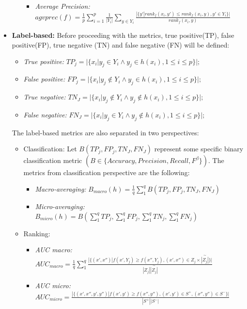 \documentclass[12pt]{report}
\begin{document}
\begin{itemize}
\begin{itemize}
\begin{itemize}
				\item \emph{Average Precision: } $agvprec(f) = \frac{1}{p} \sum_{i=1}^{p} \frac{1}{|Y_i|} \sum_{y \in Y_i} \frac{|\{y' | rank_f(x_i,y') \leq rank_f(x_i,y), y' \in Y_i\}|}{rank_f(x_i,y)}$
			\end{itemize}
		\end{itemize}
		\item \textbf{Label-based: }Before proceeding with the metrics, true positive(TP), false positive(FP), true negative (TN) and false negative (FN) will be defined:
		\begin{itemize}
			\item \emph{True positive: } $TP_j = |\{x_i | y_j \in Y_i \wedge y_j \in h(x_i), 1 \leq i \leq p \}|;$
			\item \emph{False positive: }$FP_j = |\{x_i | y_j \notin Y_i \wedge y_j \in h(x_i), 1 \leq i \leq p \}|;$
			\item \emph{True negative: }$TN_J = |\{x_i | y_j \notin Y_i \wedge y_j \notin h(x_i), 1 \leq i \leq p \}|;$
			\item \emph{False negative: }$FN_J = |\{x_i | y_j \in Y_i \wedge y_j \notin h(x_i), 1 \leq i \leq p \}|;$
		\end{itemize}
		The label-based metrics are also separated in two perspectives:
		\begin{itemize}
			\item Classification: Let $B(TP_j, FP_j, TN_J, FN_J)$ represent some specific binary classification metric $(B \in \{Accuracy, Precision, Recall, F^ \beta \})$. The metrics from classification perspective are the following:
			\begin{itemize}
				\item \emph{Macro-averaging: }$B_{macro}(h) = \frac{1}{q} \sum_{1}^{q} B(TP_j, FP_j, TN_J, FN_J)$
				\item \emph{Micro-averaging: }$B_{micro}(h) = B(\sum_{1}^{q}TP_j, \sum_{1}^{q}FP_j, \sum_{1}^{q}TN_j, \sum_{1}^{q}FN_j)$
			\end{itemize}
			\item Ranking:
			\begin{itemize}
				\item \emph{AUC macro: }$AUC_{macro} = \frac{1}{q} \sum_{1}^{q} \frac{|\{(x', x'') | f(x',Y_j) \geq f(x'',Y_j), (x',x'') \in Z_j \times \overset{\sim}{|Z_j|} \}|}{|Z_j|{\overset{\sim}{|Z_j|}}}$
				\item \emph{AUC micro: }$AUC_{micro} = \frac{|\{(x',x'',y',y'') | f(x',y') \geq f(x'',y''), (x',y') \in S^+, (x'',y'') \in S^- \}|}{|S^+||S^-|}$
			\end{itemize}
		\end{itemize} 
	\end{itemize}
	
\end{document}
